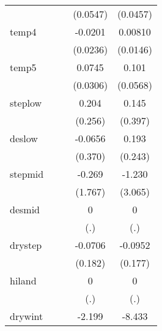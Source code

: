 {\begin{tabular}{l*{4}{c}}
            &                     &                     &    (0.0547)         &    (0.0457)         \\
[1em]
temp4       &                     &                     &     -0.0201         &     0.00810         \\
            &                     &                     &    (0.0236)         &    (0.0146)         \\
[1em]
temp5       &                     &                     &      0.0745\sym{*}  &       0.101         \\
            &                     &                     &    (0.0306)         &    (0.0568)         \\
[1em]
steplow     &                     &                     &       0.204         &       0.145         \\
            &                     &                     &     (0.256)         &     (0.397)         \\
[1em]
deslow      &                     &                     &     -0.0656         &       0.193         \\
            &                     &                     &     (0.370)         &     (0.243)         \\
[1em]
stepmid     &                     &                     &      -0.269         &      -1.230         \\
            &                     &                     &     (1.767)         &     (3.065)         \\
[1em]
desmid      &                     &                     &           0         &           0         \\
            &                     &                     &         (.)         &         (.)         \\
[1em]
drystep     &                     &                     &     -0.0706         &     -0.0952         \\
            &                     &                     &     (0.182)         &     (0.177)         \\
[1em]
hiland      &                     &                     &           0         &           0         \\
            &                     &                     &         (.)         &         (.)         \\
[1em]
drywint     &                     &                     &      -2.199         &      -8.433         \\

\end{tabular}}
